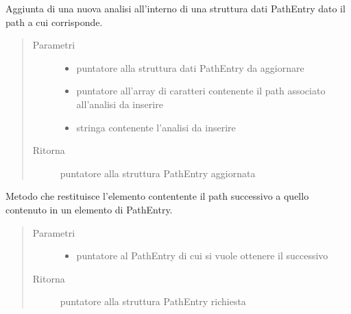 \documentclass[letterpaper,10pt,italian,openany,oneside]{sphinxmanual}
\begin{document}
\begin{fulllineitems}
\label{\detokenize{code/datastructure:c.addPathAndAnalisis}}
Aggiunta di una nuova analisi all’interno di una struttura dati PathEntry dato il path a cui corrisponde.
\begin{quote}\begin{description}
\item[{Parametri}] \leavevmode\begin{itemize}
\item {} 
 \textendash{} puntatore alla struttura dati PathEntry da aggiornare

\item {} 
 \textendash{} puntatore all’array di caratteri contenente il path associato all’analisi da inserire

\item {} 
 \textendash{} stringa contenente l’analisi da inserire

\end{itemize}

\item[{Ritorna}] \leavevmode
puntatore alla struttura PathEntry aggiornata

\end{description}\end{quote}

\end{fulllineitems}


\begin{fulllineitems}
\label{\detokenize{code/datastructure:c.getNextPath}}
Metodo che restituisce l’elemento contentente il path successivo a quello contenuto in un elemento di PathEntry.
\begin{quote}\begin{description}
\item[{Parametri}] \leavevmode\begin{itemize}
\item {} 
 \textendash{} puntatore al PathEntry di cui si vuole ottenere il successivo

\end{itemize}

\item[{Ritorna}] \leavevmode
puntatore alla struttura PathEntry richiesta

\end{description}\end{quote}

\end{fulllineitems}
\end{document}
